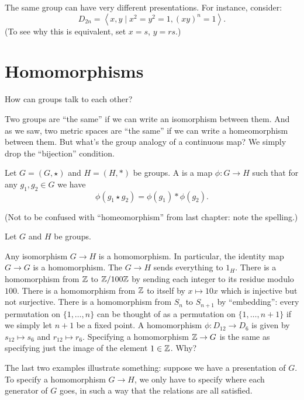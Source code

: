 \begin{example}
	The same group can have very different presentations.
	For instance, consider:
	\[ D_{2n} = \left< x,y \mid x^2=y^2=1, (xy)^n=1 \right>. \]
	(To see why this is equivalent, set $x=s$, $y=rs$.)
\end{example}

\section{Homomorphisms}

How can groups talk to each other?

Two groups are ``the same'' if we can write an isomorphism between them.
And as we saw, two metric spaces are ``the same''
if we can write a homeomorphism between them.
But what's the group analogy of a continuous map?
We simply drop the ``bijection'' condition.

\begin{definition}
	Let $G = (G, \star)$ and $H = (H, \ast)$ be groups.
	A  is a map $\phi \colon G \to H$
	such that for any $g_1, g_2 \in G$ we have
	\[ \phi(g_1 \star g_2) = \phi(g_1) \ast \phi(g_2). \]
\end{definition}
(Not to be confused with ``homeomorphism'' from
last chapter: note the spelling.)

\begin{example}
	Let $G$ and $H$ be groups.
	\begin{enumerate}[(a)]
		\ii Any isomorphism $G \to H$ is a homomorphism.
		In particular, the identity map $G \to G$ is a homomorphism.
		\ii The  $G \to H$ sends
		everything to $1_H$.
		\ii There is a homomorphism from $\mathbb Z$ to $\mathbb Z/100\mathbb Z$ by
		sending each integer to its residue modulo $100$.
		\ii There is a homomorphism from $\mathbb Z$ to itself by $x \mapsto 10x$
		which is injective but not surjective.
		\ii There is a homomorphism from $S_n$ to $S_{n+1}$ by ``embedding'':
		every permutation on $\{1,\dots,n\}$ can be thought of as a permutation
		on $\{1,\dots,n+1\}$ if we simply let $n+1$ be a fixed point.
		\ii A homomorphism $\phi: D_{12} \to D_6$
		is given by $s_{12} \mapsto s_6$
		and $r_{12} \mapsto r_6$.
		\ii Specifying a homomorphism $\mathbb Z \to G$ is the same as
		specifying just the image of the element $1 \in \mathbb Z$. Why?
	\end{enumerate}
\end{example}
The last two examples illustrate something: suppose we have a presentation of $G$.
To specify a homomorphism $G \to H$, we only have to specify where each generator of $G$ goes, in such a way that the relations are all satisfied.

